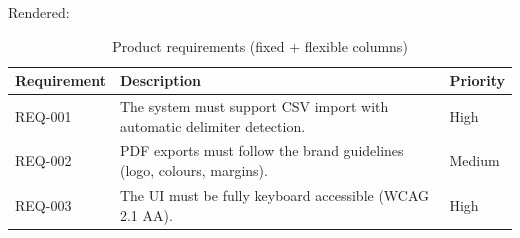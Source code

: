 \documentclass[a4paper,twoside]{article}
\begin{document}
Rendered:
\begin{table}[H]
\centering
\caption{Product requirements (fixed + flexible columns)}
\vspace{0.5em}
\begin{tabularx}{0.9\linewidth}{>{\raggedright\arraybackslash}p{}X>{\centering\arraybackslash}p{}}
\toprule
Requirement & Description & Priority \\
\midrule
REQ-001 & The system must support CSV import with automatic delimiter detection. & High \\
REQ-002 & PDF exports must follow the brand guidelines (logo, colours, margins). & Medium \\
REQ-003 & The UI must be fully keyboard accessible (WCAG 2.1 AA). & High \\
\bottomrule
\end{tabularx}
\end{table}
\end{document}
